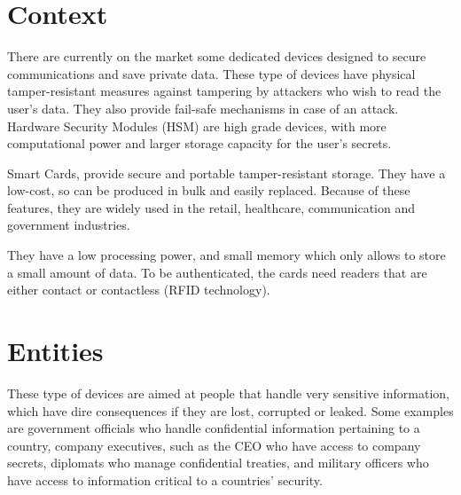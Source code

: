 \cleardoublepage
\label{chap:problem}


\section{Context} \label{chap:problem:context}



There are currently on the market some dedicated devices designed to secure communications and save private data.
These type of devices have physical tamper-resistant measures against tampering by attackers who wish to read the user's data. They also provide fail-safe mechanisms in case of an attack.
Hardware Security Modules (HSM) are high grade devices, with more computational power and larger storage capacity for the user's secrets.

Smart Cards,  provide secure and portable tamper-resistant storage.
They have a low-cost, so can be produced in bulk and easily replaced.
Because of these features, they are widely used in the retail, healthcare, communication and government industries.

They have a low processing power, and small memory which only allows to store a small amount of data.
To be authenticated, the cards need readers that are either contact or contactless (RFID technology).

\section{Entities} \label{chap:problem:entities}

These type of devices are aimed at people that handle very sensitive information, which have dire consequences if they are lost, corrupted or leaked.
Some examples are government officials who handle confidential information pertaining to a country, company executives, such as the CEO who have access to company secrets, diplomats who manage confidential treaties, and military officers who have access to information critical to a countries' security.

